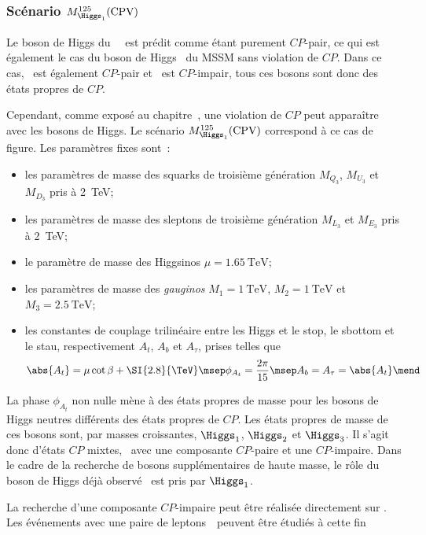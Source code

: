 \subsubsection{Scénario $M_{\Higgs_1}^{125}(\text{CPV})$}
Le boson de Higgs du \SM\ \higgsSM\ est prédit comme étant purement $CP$-pair,
ce qui est également le cas du boson de Higgs \higgsMSSM\ du MSSM sans violation de $CP$.
Dans ce cas, \Higgs\ est également $CP$-pair et \HiggsA\ est $CP$-impair,
tous ces bosons sont donc des états propres de $CP$.
\par
Cependant, comme exposé au chapitre~,
une violation de $CP$ peut apparaître avec les bosons de Higgs.
Le scénario $M_{\Higgs_1}^{125}(\text{CPV})$ correspond à ce cas de figure.
Les paramètres fixes sont~\cite{Bagnaschi_2019}:
\begin{itemize}
\item les paramètres de masse des squarks de troisième génération $M_{Q_3}$, $M_{U_3}$ et $M_{D_3}$ pris à \SI{2}{\TeV};
\item les paramètres de masse des sleptons de troisième génération $M_{L_3}$ et $M_{E_3}$ pris à \SI{2}{\TeV};
\item le paramètre de masse des Higgsinos $\mu=\SI{1.65}{\TeV}$;
\item les paramètres de masse des \emph{gauginos} $M_1=\SI{1}{\TeV}$, $M_2=\SI{1}{\TeV}$ et $M_3=\SI{2.5}{\TeV}$;
\item les constantes de couplage trilinéaire entre les Higgs et le stop, le sbottom et le stau, respectivement $A_t$, $A_b$ et $A_\tau$, prises telles que
\begin{equation}
\abs{A_t} = \mu\cot\beta+\SI{2.8}{\TeV}
\msep
\phi_{A_t} = \frac{2\pi}{15}
\msep
A_b = A_\tau = \abs{A_t}
\mend
\end{equation}
\end{itemize}
La phase $\phi_{A_t}$ non nulle mène à des états propres de masse
pour les bosons de Higgs neutres différents des états propres de $CP$.
Les états propres de masse de ces bosons sont, par masses croissantes,
$\Higgs_1$, $\Higgs_2$ et $\Higgs_3$.
Il s'agit donc d'états $CP$ mixtes,
\ie\ avec une composante $CP$-paire et une $CP$-impaire.
Dans le cadre de la recherche de bosons supplémentaires de haute masse,
le rôle du boson de Higgs déjà observé \higgs\ est pris par $\Higgs_1$.
\par
La recherche d'une composante $CP$-impaire peut être réalisée directement sur \higgs.
Les événements avec une paire de leptons~\tau\ peuvent être étudiés à cette fin~\cite{Bourgatte_thesis}
